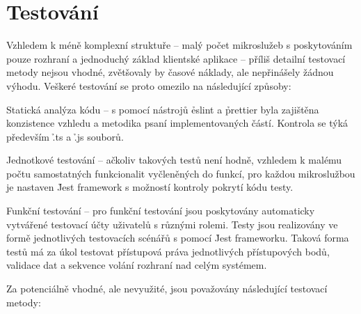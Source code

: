 \chapter{Testování}\label{ch:testing}


Vzhledem k méně komplexní struktuře  – malý počet mikroslužeb s poskytováním pouze  rozhraní a jednoduchý základ klientské aplikace – příliš detailní testovací metody nejsou vhodné, zvětšovaly by časové náklady, ale nepřinášely žádnou výhodu.
Veškeré testování se proto omezilo na následující způsoby:

\begin{dl}
   \item[Statická analýza kódu] – s pomocí nástrojů \h{eslint} a \h{prettier} byla zajištěna konzistence vzhledu a metodika psaní implementovaných částí.
   Kontrola se týká především \h{.ts} a \h{.js} souborů.
   \item[Jednotkové testování] – ačkoliv takových testů není hodně, vzhledem k malému počtu samostatných funkcionalit vyčleněných do funkcí, pro každou mikroslužbou je nastaven \h{Jest} framework s možností kontroly pokrytí kódu testy.
   \item[Funkční testování] – pro funkční testování jsou poskytovány automaticky vytvářené testovací účty uživatelů s různými rolemi.
   Testy jsou realizovány ve formě jednotlivých testovacích scénářů s pomocí \h{Jest} frameworku.
   Taková forma testů má za úkol testovat přístupová práva jednotlivých přístupových bodů, validace dat a sekvence volání  rozhraní nad celým systémem.
\end{dl}

\newpage

Za potenciálně vhodné, ale nevyužité, jsou považovány následující testovací metody:

